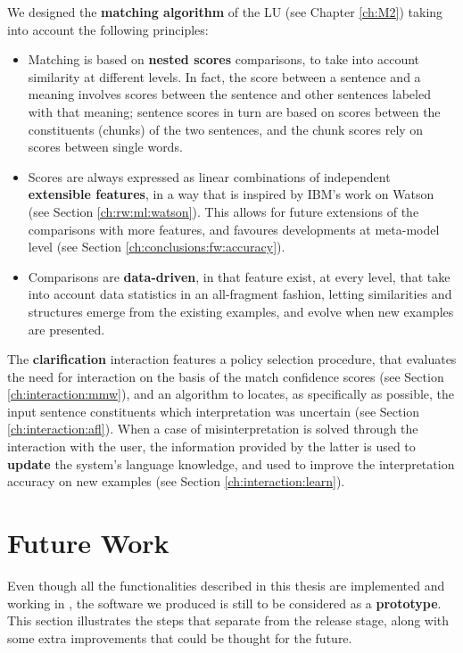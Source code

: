 We designed the \textbf{matching algorithm} of the LU (see Chapter \ref{ch:M2}) taking into account the following principles:
\begin{itemize}
	\item Matching is based on \textbf{nested scores} comparisons, to take into account similarity at different levels. In fact, the score between a sentence and a meaning involves scores between the sentence and other sentences labeled with that meaning; sentence scores in turn are based on scores between the constituents (chunks) of the two sentences, and the chunk scores rely on scores between single words.
	\item Scores are always expressed as linear combinations of independent \textbf{extensible features}, in a way that is inspired by IBM's work on Watson (see Section \ref{ch:rw:ml:watson}). This allows for future extensions of the comparisons with more features, and favoures developments at meta-model level (see Section \ref{ch:conclusions:fw:accuracy}).
	\item Comparisons are \textbf{data-driven}, in that feature exist, at every level, that take into account data statistics in an all-fragment fashion, letting similarities and structures emerge from the existing examples, and evolve when new examples are presented.
\end{itemize}

The \textbf{clarification} interaction features a policy selection procedure, that evaluates the need for interaction on the basis of the match confidence scores (see Section \ref{ch:interaction:mmw}), and an algorithm to locates, as specifically as possible, the input sentence constituents which interpretation was uncertain (see Section \ref{ch:interaction:afl}). When a case of misinterpretation is solved through the interaction with the user, the information provided by the latter is used to \textbf{update} the system's language knowledge, and used to improve the interpretation accuracy on new examples (see Section \ref{ch:interaction:learn}).

\section{Future Work}
Even though all the functionalities described in this thesis are implemented and working in \pname, the software we produced is still to be considered as a \textbf{prototype}. This section illustrates the steps that separate \pname from the release stage, along with some extra improvements that could be thought for the future.

